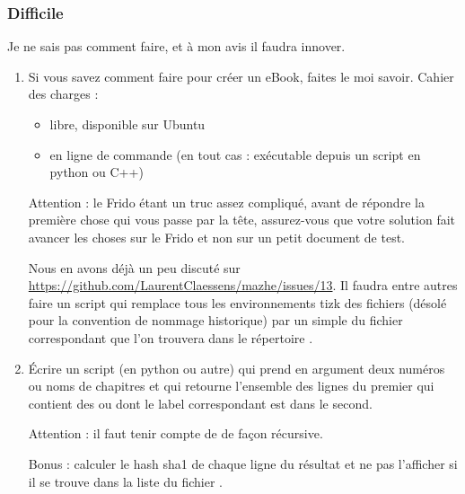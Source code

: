 \subsubsection{Difficile}

Je ne sais pas comment faire, et à mon avis il faudra innover.

\begin{enumerate}
    \item
        Si vous savez comment faire  pour créer un eBook, faites le moi savoir. Cahier des charges :
        \begin{itemize}
            \item libre, disponible sur Ubuntu
            \item en ligne de commande (en tout cas : exécutable depuis un script en python ou C++)
        \end{itemize}
        Attention : le Frido étant un truc assez compliqué, avant de répondre la première chose qui vous passe par la tête, assurez-vous que votre solution fait avancer les choses sur le Frido et non sur un petit document de test.

        Nous en avons déjà un peu discuté sur \url{https://github.com/LaurentClaessens/mazhe/issues/13}. Il faudra entre autres faire un script qui remplace tous les environnements tizk des fichiers  (désolé pour la convention de nommage historique) par un simple  du fichier  correspondant que l'on trouvera dans le répertoire .
    \item
        Écrire un script (en python ou autre) qui prend en argument deux numéros ou noms de chapitres et qui retourne l'ensemble des lignes du premier qui contient des  ou  dont le label correspondant est dans le second.

        Attention : il faut tenir compte de  de façon récursive.

        Bonus : calculer le hash sha1 de chaque ligne du résultat et ne pas l'afficher si il se trouve dans la liste du fichier .
\end{enumerate}

